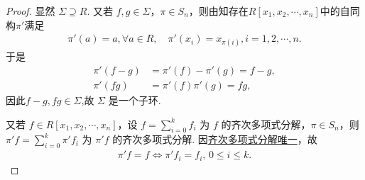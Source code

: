 \documentclass[../../main.tex]{subfiles}%
\begin{document}
\begin{proof}
显然 \( \Sigma \supseteq R \). 又若 \( f, g \in \Sigma \)，\( \pi \in S_n \)，则由知存在$R[x_1,x_2,\cdots,x_n]$中的自同构$\pi'$满足
\begin{align*}
\pi'(a) = a, \forall a \in R, \quad \pi'(x_i) = x_{\pi(i)}, i = 1, 2, \cdots, n.
\end{align*}
于是
\begin{align*}
\pi'(f - g) &= \pi'(f) - \pi'(g) = f - g, \\
\pi'(fg) &= \pi'(f)\pi'(g) = fg,
\end{align*}
因此$f-g,fg\in \Sigma$,故 \( \Sigma \) 是一个子环.

又若 \( f \in R[x_1, x_2, \cdots, x_n] \)，设 \( f = \sum_{i=0}^k f_i \) 为 \( f \) 的齐次多项式分解，\( \pi \in S_n \)，则 \( \pi' f = \sum_{i=0}^k \pi' f_i \) 为 \( \pi' f \) 的齐次多项式分解. 因\hyperref[theorem:多项式的齐次分解]{齐次多项式分解唯一}，故
\begin{align*}
\pi' f = f \iff \pi' f_i = f_i, \, 0 \leqslant i \leqslant k.
\end{align*}
\end{proof}
\end{document}
